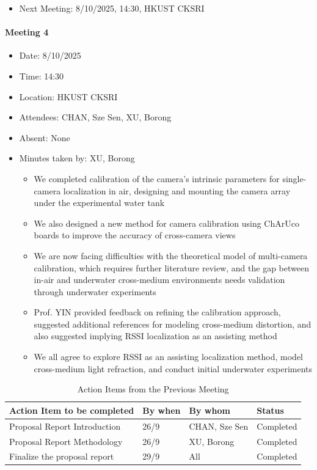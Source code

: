 \documentclass[11pt]{article}
\begin{document}
    \begin{itemize}
        \item Next Meeting: 8/10/2025, 14:30, HKUST CKSRI
    \end{itemize}
    \newpage
    \paragraph{Meeting 4}
    \begin{itemize}
        \item Date: 8/10/2025
        \item Time: 14:30
        \item Location: HKUST CKSRI
        \item Attendees: CHAN, Sze Sen, XU, Borong
        \item Absent: None
        \item Minutes taken by: XU, Borong
        \begin{itemize}
            \item We completed calibration of the camera's intrinsic parameters for single-camera localization in air, designing and mounting the camera array under the experimental water tank
            \item We also designed a new method for camera calibration using ChArUco boards to improve the accuracy of cross-camera views
            \item We are now facing difficulties with the theoretical model of multi-camera calibration, which requires further literature review, and the gap between in-air and underwater cross-medium environments needs validation through underwater experiments
            \item Prof. YIN provided feedback on refining the calibration approach,  suggested additional references for modeling cross-medium distortion, and also suggested implying RSSI localization as an assisting method
            \item We all agree to explore RSSI as an assisting localization method, model cross-medium light refraction, and conduct initial underwater experiments
        \end{itemize}
    \end{itemize}
    \begin{longtable}[c]{|l|l|l|l|}
        \caption{Action Items from the Previous Meeting}\\
        \hline
        \textbf{Action Item to be completed} & \textbf{By when} & \textbf{By whom} & \textbf{Status} \\
        \hline
        \endhead
        Proposal Report Introduction & 26/9 & CHAN, Sze Sen & Completed \\
        \hline
        Proposal Report Methodology & 26/9 & XU, Borong & Completed \\
        \hline
        Finalize the proposal report & 29/9 & All & Completed \\
        \hline
    \end{longtable}
\end{document}
